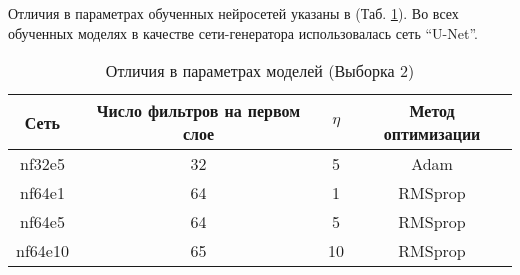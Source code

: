 			Отличия в параметрах обученных нейросетей указаны в (Таб. \ref{8-sand-trend8-nns}). Во всех обученных моделях в качестве сети-генератора использовалась сеть ``U-Net''.
			
			\begin{table}[h!]
				\begin{center}
					\begin{tabular}{|c|c|c|c|}
						\hline
						Сеть & Число фильтров на первом слое & $\eta$ & Метод оптимизации\\
						\hline
						nf32e5 & 32 & 5 & Adam \\
						\hline
						nf64e1 & 64 & 1 & RMSprop \\
						\hline
						nf64e5 & 64 & 5 & RMSprop \\
						\hline
						nf64e10 & 65 & 10 & RMSprop \\
						\hline
					\end{tabular}
					\caption{Отличия в параметрах моделей (Выборка 2)}
					\label{8-sand-trend8-nns}
				\end{center}
			\end{table}
			

